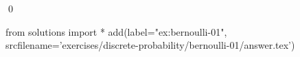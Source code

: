 
\begin{ex} 
  \label{ex:bernoulli-01}
  
  \qed
\end{ex} 
\begin{python0}
from solutions import *
add(label="ex:bernoulli-01",
    srcfilename='exercises/discrete-probability/bernoulli-01/answer.tex') 
\end{python0}
